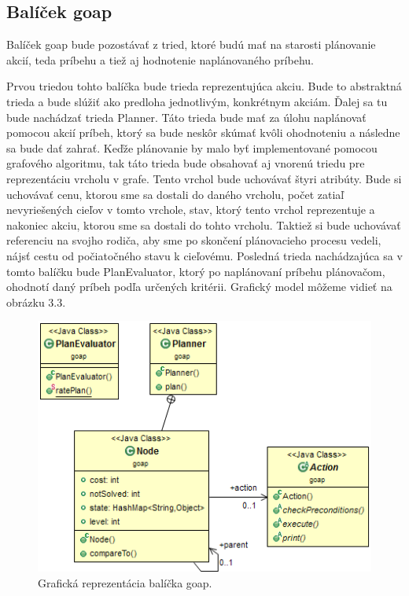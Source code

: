 \subsection{Balíček goap}
Balíček goap bude pozostávať z tried, ktoré budú mať na starosti plánovanie akcií, teda príbehu a tiež aj hodnotenie naplánovaného príbehu.\par
Prvou triedou tohto balíčka bude trieda reprezentujúca akciu. Bude to abstraktná trieda a bude slúžiť ako predloha jednotlivým, konkrétnym akciám. Ďalej sa tu bude nachádzať trieda Planner. Táto trieda bude mať za úlohu naplánovať pomocou akcií príbeh, ktorý sa bude neskôr skúmať kvôli ohodnoteniu a následne sa bude dať zahrať. Keďže plánovanie by malo byť implementované pomocou grafového algoritmu, tak táto trieda bude obsahovať aj vnorenú triedu pre reprezentáciu vrcholu v grafe. Tento vrchol bude uchovávať štyri atribúty. Bude si uchovávať cenu, ktorou sme sa dostali do daného vrcholu, počet zatiaľ nevyriešených cieľov v tomto vrchole, stav, ktorý tento vrchol reprezentuje a nakoniec akciu, ktorou sme sa dostali do tohto vrcholu. Taktiež si bude uchovávať referenciu na svojho rodiča, aby sme po skončení plánovacieho procesu vedeli, nájsť cestu od počiatočného stavu k cieľovému. Posledná trieda nachádzajúca sa v tomto balíčku bude PlanEvaluator, ktorý po naplánovaní príbehu plánovačom, ohodnotí daný príbeh podľa určených kritérii. Grafický model môžeme vidieť na obrázku 3.3.
\begin{figure}[H] 
\begin{center}
\includegraphics[scale=0.9]{img/goap.png}
\caption{Grafická reprezentácia balíčka goap.}
\label{fig:ch33}
\end{center}
\end{figure}

